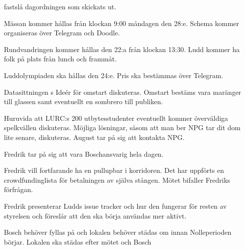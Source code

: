\documentclass{protokoll}
\begin{document}
\newpage  


\begin{beslut}
     \att fastslå dagordningen som skickats ut.
\end{beslut}

Mässan kommer hållas från klockan 9:00 måndagen den 28:e. Schema kommer organiseras över Telegram och Doodle.

Rundvandringen kommer hållas den 22:a från klockan 13:30. Ludd kommer ha folk på plats från lunch och frammåt.

Luddolympiaden ska hållas den 24:e. Pris ska bestämmas över Telegram.

Datasittningen s
Ideér för omstart diskuteras. Omstart bestäms vara maränger till glassen samt eventuellt en sombrero till publiken.

Huruvida att LURC:s 200 utbytesstudenter eventuellt kommer överväldiga spelkvällen diskuteras. Möjliga lösningar, såsom att man ber NPG tar dit dom lite senare, diskuteras. August tar på sig att kontakta NPG.  

Fredrik tar på sig att vara Boschansvarig hela dagen.

Fredrik vill fortfarande ha en pullupbar i korridoren. Det har uppförts en crowdfundinglista för betalningen av själva stången. 
Mötet bifaller Fredriks förfrågan.

Fredrik presenterar Ludds issue tracker och hur den fungerar för resten av styrelsen och föreslår att den ska börja användas mer aktivt. 

Bosch behöver fyllas på och lokalen behöver städas om innan Nolleperioden börjar. Lokalen ska städas efter mötet och Bosch 
\end{document}
